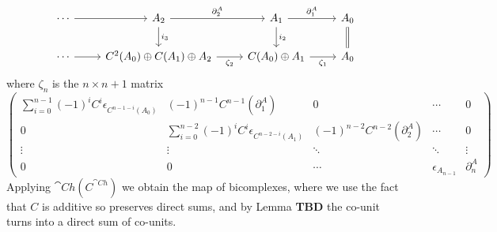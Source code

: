 \[\begin{tikzcd}
	\cdots & {A_2} & {A_1} & {A_0} \\
	\cdots & {C^2(A_0)\oplus C(A_1)\oplus A_2} & {C(A_0)\oplus A_1} & {A_0}
	\arrow["{\partial_2^A}", from=1-2, to=1-3]
	\arrow[from=1-1, to=1-2]
	\arrow["{\partial_1^A}", from=1-3, to=1-4]
	\arrow[Rightarrow, no head, from=1-4, to=2-4]
	\arrow["{i_2}", from=1-3, to=2-3]
	\arrow["{i_3}", from=1-2, to=2-2]
	\arrow[from=2-1, to=2-2]
	\arrow["{\zeta_2}"', from=2-2, to=2-3]
	\arrow["{\zeta_1}"', from=2-3, to=2-4]
\end{tikzcd}\]
where $\zeta_n$ is the $n\times n+1$ matrix 
\begin{equation*}
    \begin{pmatrix}
        \sum_{i=0}^{n-1}(-1)^iC^i\epsilon_{C^{n-1-i}(A_0)} & (-1)^{n-1}C^{n-1}(\partial_1^A) & 0 & \cdots & 0 \\
        0 & \sum_{i=0}^{n-2}(-1)^iC^i\epsilon_{C^{n-2-i}(A_1)} & (-1)^{n-2}C^{n-2}(\partial_2^A) & \cdots & 0 \\
        \vdots & \vdots & \ddots & \ddots & \vdots \\
        0 & 0 & \cdots & \epsilon_{A_{n-1}} & \partial_{n}^A
    \end{pmatrix}
\end{equation*}
Applying $\cat{Ch}(C^{\cat{Ch}})$ we obtain the map of bicomplexes, where we use the fact that $C$ is additive so preserves direct sums, and by Lemma \textbf{TBD} the co-unit turns into a direct sum of co-units.
